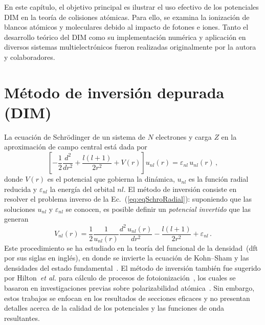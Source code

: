 En este capítulo, el objetivo principal es ilustrar el uso efectivo de 
los potenciales DIM en la teoría de colisiones atómicas. Para ello, se 
examina la ionización de blancos atómicos y moleculares debido al 
impacto de fotones e iones. Tanto el desarrollo teórico del DIM como su 
implementación numérica y aplicación en diversos sistemas 
multielectrónicos fueron realizadas originalmente por la autora y 
colaboradores. 

\section{Método de inversión depurada (DIM)}
\label{sec:dimatomos}

La ecuación de Schr\"odinger de un sistema de $N$ electrones y carga $Z$ 
en la aproximación de campo central está dada por
\begin{equation}
 \left[ -\frac{1}{2}\frac{d^2}{dr^2} + \frac{l(l+1)}{2r^2} +
 V(r) \right] u_{nl}(r) = \varepsilon_{nl} \, u_{nl}(r)\,,
\label{eq:eqSchroRadial}
\end{equation}
donde $V(r)$ es el potencial que gobierna la dinámica, $u_{nl}$ es la 
función radial reducida y $\varepsilon_{nl}$ la energía del orbital 
$nl$. 
El método de inversión consiste en resolver el problema inverso de la 
Ec.~(\ref{eq:eqSchroRadial}): suponiendo que las soluciones $u_{nl}$ y 
$\varepsilon_{nl}$ se conocen, es posible definir un \textit{potencial 
invertido} que las generan
\begin{equation}
V_{nl}(r) = 
\frac{1}{2}\frac{1}{u_{nl}(r)} \frac{d^2\,u_{nl}(r)}{dr^{2}} - 
\frac{l(l+1)}{2r^{2}}+\varepsilon_{nl} \,.
\label{eq:Vinv}
\end{equation}
Este procedimiento se ha estudiado en la teoría del funcional de la 
densidad~(\acs{dft} por sus siglas en inglés), en donde se invierte la
ecuación de Kohn--Sham y las densidades del estado 
fundamental~\cite{Wu:03,Gaiduk:13,Ryabinkin:15,Schipper:97,deSilva:12,
Kananenka:13,Jacob:11}. El método de inversión también fue sugerido por 
Hilton~\textit{et al.} para cálculo de procesos de 
fotoionización~\cite{Hilton:77,Suzer:77,Hilton:79,Hilton:80,Crljen:87}, 
los cuales se basaron en investigaciones previas sobre polarizabilidad 
atómica~\cite{Sternheimer:54,Dalgarno:59}. Sin embargo, estos trabajos 
se enfocan en los resultados de secciones eficaces y no presentan 
detalles acerca de la calidad de los potenciales y las funciones de onda 
resultantes. 


